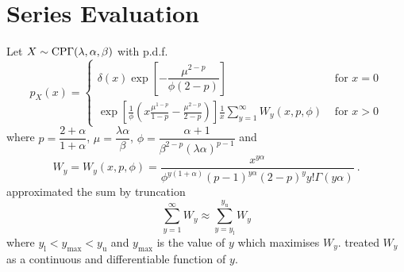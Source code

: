 \section{Series Evaluation}
\label{chapter:appendix_compoundPoissonSeries}

Let $X\sim\operatorname{CP\Gamma}(\lambda,\alpha,\beta)$ with p.d.f.
\begin{equation*}
  p_X(x) = 
  \begin{cases}
    \delta(x) \exp
      \left[
          -\dfrac{\mu^{2-p}}{\phi(2-p)}
      \right] 
    &\text{ for } x=0
    \\ 
    \displaystyle
    \exp\left[
      \frac{1}{\phi}
      \left(
        x\frac{\mu^{1-p}}{1-p}-\frac{\mu^{2-p}}{2-p}
      \right)
    \right]
    \frac{1}{x}
    \sum_{y=1}^{\infty}W_y(x,p,\phi)
    &\text{ for } x>0
  \end{cases}
\end{equation*}
where $p=\dfrac{2+\alpha}{1+\alpha}$, $\mu=\dfrac{\lambda\alpha}{\beta}$, $\phi = \dfrac{\alpha+1}{\beta^{2-p}(\lambda\alpha)^{p-1}}$ and
\begin{equation}
  W_y = W_y(x,p,\phi)=\frac{x^{y\alpha}}{\phi^{y(1+\alpha)}(p-1)^{y\alpha}(2-p)^yy!\Gamma(y\alpha)}
  \ .
\end{equation}
\cite{dunn2005series} approximated the sum by truncation
\begin{equation}
  \sum_{y=1}^\infty W_y \approx \sum_{y=y_\text{l}}^{y_\text{u}}W_y
\end{equation}
where $y_\text{l}<y_{\text{max}}<y_\text{u}$ and $y_{\text{max}}$ is the value of $y$ which maximises $W_y$. \cite{dunn2005series} treated $W_y$ as a continuous and differentiable function of $y$.

